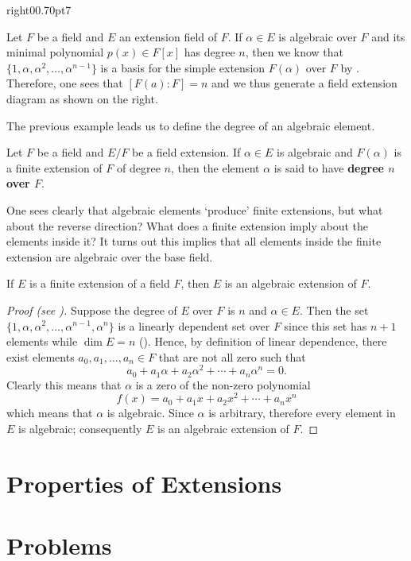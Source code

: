 \begin{examplewithcutout}{right}{0}{0.7\textwidth}{0pt}{7}{
    \begin{figure}[H]
        \centering
    \end{figure}
}
    Let $F$ be a field and $E$ an extension field of $F$. If $\alpha \in E$ is algebraic over $F$ and its minimal polynomial $p(x) \in F[x]$ has degree $n$, then we know that $\{1, \alpha, \alpha^2, \dots, \alpha^{n-1}\}$ is a basis for the simple extension $F(\alpha)$ over $F$ by . Therefore, one sees that $[F(a): F] = n$ and we thus generate a field extension diagram as shown on the right.
\end{examplewithcutout}

The previous example leads us to define the degree of an algebraic element.

\begin{definition}
    Let $F$ be a field and $E/F$ be a field extension. If $\alpha \in E$ is algebraic and $F(\alpha)$ is a finite extension of $F$ of degree $n$, then the element $\alpha$ is said to have \textbf{degree $n$ over $F$}.
\end{definition}

One sees clearly that algebraic elements `produce' finite extensions, but what about the reverse direction? What does a finite extension imply about the elements inside it? It turns out this implies that all elements inside the finite extension are algebraic over the base field.

\begin{theorem}
    If $E$ is a finite extension of a field $F$, then $E$ is an algebraic extension of $F$.
\end{theorem}
\begin{proof}[Proof (see {\cite[Theorem 21.4]{gallian_2016}})]
    Suppose the degree of $E$ over $F$ is $n$ and $\alpha \in E$. Then the set $\{1, \alpha, \alpha^2, \dots, \alpha^{n-1}, \alpha^n\}$ is a linearly dependent set over $F$ since this set has $n + 1$ elements while $\dim E = n$ (). Hence, by definition of linear dependence, there exist elements $a_0, a_1, \dots, a_n \in F$ that are not all zero such that
    \[
        a_0 + a_1\alpha + a_2\alpha^2 + \cdots + a_n\alpha^n = 0.
    \]
    Clearly this means that $\alpha$ is a zero of the non-zero polynomial
    \[
        f(x) = a_0 + a_1x + a_2x^2 + \cdots + a_nx^n
    \]
    which means that $\alpha$ is algebraic. Since $\alpha$ is arbitrary, therefore every element in $E$ is algebraic; consequently $E$ is an algebraic extension of $F$.
\end{proof}


\section{Properties of Extensions}

\newpage

\section{Problems}
